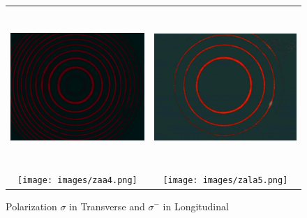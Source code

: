 \documentclass[a4paper,12pt,abstracton]{scrartcl}
\begin{document}
\begin{figure}[H]
    \centering
    \begin{tabular}{c c}
      \includegraphics[height=6cm,keepaspectratio]{images/zna5.png} & \includegraphics[height=6cm,keepaspectratio]{images/znla8.png} \\
      \texttt{[image: images/zaa4.png]} & \texttt{[image: images/zala5.png]} \\
      \end{tabular}
    \caption{Polarization $\sigma$ in Transverse and $\sigma^{-}$ in Longitudinal}
    \label{fig:pa}
\end{figure}
\end{document}
